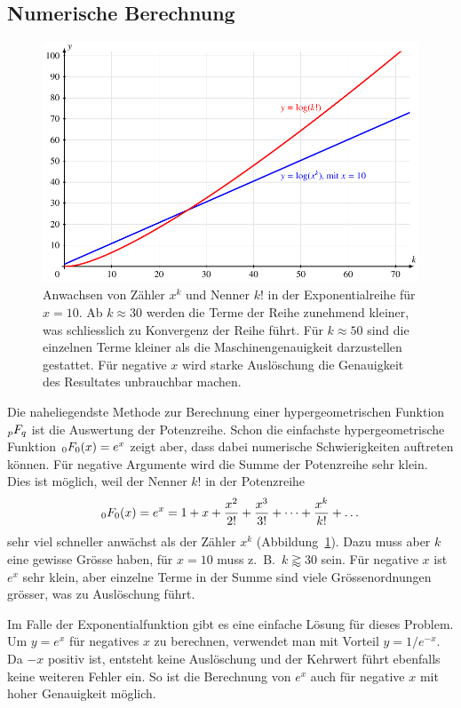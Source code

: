 \subsection{Numerische Berechnung}
\begin{figure}
\centering
\includegraphics{chapters/040-rekursion/images/powergamma.pdf}
\caption{Anwachsen von Zähler $x^k$ und Nenner $k!$ in der
Exponentialreihe für $x=10$. 
Ab $k\approx 30$ werden die Terme der Reihe zunehmend kleiner,
was schliesslich zu Konvergenz der Reihe führt.
Für $k\approx 50$ sind die einzelnen Terme kleiner als die
Maschinengenauigkeit darzustellen gestattet.
Für negative $x$ wird starke Auslöschung die Genauigkeit des Resultates
unbrauchbar machen.
\label{buch:rekursion:hypergeometrisch:fig:powergamma}}
\end{figure}
Die naheliegendste Methode zur Berechnung einer hypergeometrischen
Funktion  $\mathstrut_pF_q$ ist die Auswertung der Potenzreihe.
Schon die einfachste hypergeometrische Funktion $\mathstrut_0F_0(x)=e^x$
zeigt aber, dass dabei numerische Schwierigkeiten auftreten können.
Für negative Argumente wird die Summe der Potenzreihe sehr klein.
Dies ist möglich, weil der Nenner $k!$ in der Potenzreihe
\[
\mathstrut_0F_0(x)
=
e^x
= 
1+x+\frac{x^2}{2!} + \frac{x^3}{3!} + \dots + \frac{x^k}{k!}+\dots
\]
sehr viel schneller anwächst als der Zähler $x^k$
(Abbildung~\ref{buch:rekursion:hypergeometrisch:fig:powergamma}).
Dazu muss aber $k$ eine gewisse Grösse haben, für $x=10$ muss
z.~B.~$k\gtrapprox30$ sein.
Für negative $x$ ist $e^x$ sehr klein, aber einzelne Terme in der
Summe sind viele Grössenordnungen grösser, was zu Auslöschung führt.

Im Falle der Exponentialfunktion gibt es eine einfache Lösung für
dieses Problem.
Um $y=e^x$ für negatives $x$ zu berechnen, verwendet man mit Vorteil
$y=1/e^{-x}$. Da $-x$ positiv ist, entsteht keine Auslöschung und der
Kehrwert führt ebenfalls keine weiteren Fehler ein.
So ist die Berechnung von $e^x$ auch für negative $x$ mit hoher
Genauigkeit möglich.

